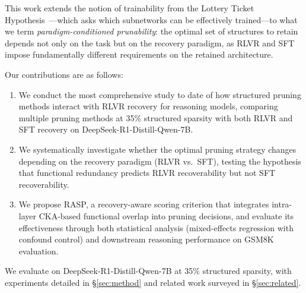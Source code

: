 This work extends the notion of trainability from the Lottery Ticket Hypothesis~\citep{frankle2019lth}---which asks which subnetworks can be effectively trained---to what we term \emph{paradigm-conditioned prunability}: the optimal set of structures to retain depends not only on the task but on the recovery paradigm, as RLVR and SFT impose fundamentally different requirements on the retained architecture.

Our contributions are as follows:
\begin{enumerate}[nosep,leftmargin=*]
    \item We conduct the most comprehensive study to date %
    of how structured pruning methods interact with RLVR recovery for reasoning models, comparing multiple pruning methods at 35\% structured sparsity with both RLVR and SFT recovery on DeepSeek-R1-Distill-Qwen-7B.
    \item We systematically investigate whether the optimal pruning strategy changes depending on the recovery paradigm (RLVR vs.\ SFT), testing the hypothesis that functional redundancy predicts RLVR recoverability but not SFT recoverability.
    \item We propose RASP, a recovery-aware scoring criterion that integrates intra-layer CKA-based functional overlap into pruning decisions, and evaluate its effectiveness through both statistical analysis (mixed-effects regression with confound control) and downstream reasoning performance on GSM8K evaluation.
\end{enumerate}

We evaluate on DeepSeek-R1-Distill-Qwen-7B at 35\% structured sparsity, with experiments detailed in \S\ref{sec:method} and related work surveyed in \S\ref{sec:related}.
